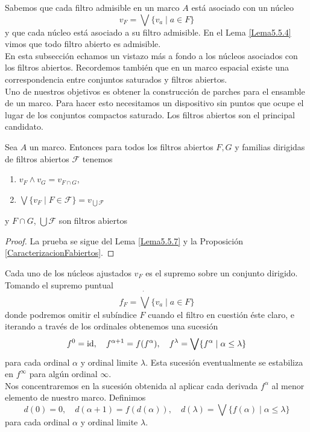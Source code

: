 Sabemos que cada filtro admisible en un marco $A$ está asociado con un núcleo 
\[
v_F=\bigvee\{v_a\mid a\in F\}
\]
y que cada núcleo está asociado a su filtro admisible. En el Lema \ref{Lema5.5.4} vimos que todo filtro abierto es admisible.\\

En esta subsección echamos un vistazo más a fondo a los núcleos asociados con los filtros abiertos. Recordemos también que en un marco espacial existe una correspondencia entre conjuntos saturados y filtros abiertos.\\

Uno de nuestros objetivos es obtener la construcción de parches para el ensamble de un marco. Para hacer esto necesitamos un dispositivo sin puntos que ocupe el lugar de los conjuntos compactos saturado. Los filtros abiertos son el principal candidato.

\begin{lem}
    Sea $A$ un marco. Entonces para todos los filtros abiertos $F, G$ y familias dirigidas de filtros abiertos $\mathcal{F}$ tenemos
    \begin{enumerate}[$i) $]
        \item $v_F\wedge v_G=v_{F\cap G}$,
        \item $\bigvee\{v_F\mid F\in \mathcal{F}\}=v_{\bigcup \mathcal{F}}$
    \end{enumerate}
    y $F\cap G$, $\bigcup \mathcal{F}$ son filtros abiertos
\end{lem}

\begin{proof}
    La prueba se sigue del Lema \ref{Lema5.5.7} y la Proposición \ref{CaracterizacionFabiertos}.
\end{proof}

Cada uno de los núcleos ajustados $v_F$ es el supremo sobre un conjunto dirigido. Tomando el supremo puntual
\[
f_F=\dot{\bigvee}\{v_a\mid a\in F\}
\]
donde podremos omitir el subíndice $F$ cuando el filtro en cuestión éste claro, e iterando a través de los ordinales obtenemos una sucesión 
\[
f^0=\mathrm{id},\quad f^{\alpha+1}=f(f^\alpha), \quad f^\lambda=\bigvee\{f^\alpha\mid \alpha \leq \lambda\}
\]
para cada ordinal $\alpha$ y ordinal limite $\lambda$. Esta sucesión eventualmente se estabiliza en $f^\infty$ para algún ordinal $\infty$.\\

Nos concentraremos en la sucesión obtenida al aplicar cada derivada $f^\alpha$ al menor elemento de nuestro marco. Definimos
\[
d(0)=0,\quad d(\alpha +1)=f(d(\alpha)), \quad d(\lambda)=\bigvee\{f(\alpha)\mid \alpha\leq \lambda\}
\]
para cada ordinal $\alpha$ y ordinal limite $\lambda$.\\

